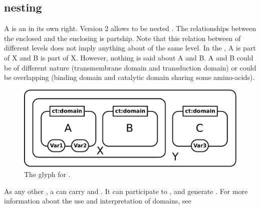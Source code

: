 
\subsection{ nesting }
\label{sec:domain}

A  is an  in its own right. \SBGNERLone Version 2 allows  to be nested . The relationships between the enclosed  and the enclosing  is partship. Note that this relation between  of different levels does not imply anything about  of the same level. In the , A is part of X and B is part of X. However, nothing is said about A and B. A and B could be of different nature (transmembrane domain and transduction domain) or could be overlapping (binding domain and catalytic domain sharing some amino-acids). 

\begin{figure}[H]
  \centering
  \includegraphics[scale = 0.3]{images/domain}
  \caption{The \ER glyph for .}
  \label{fig:domain}
\end{figure}

As any other , a  can carry  and . It can participate to , and generate . For more information about the use and interpretation of domains, see  

